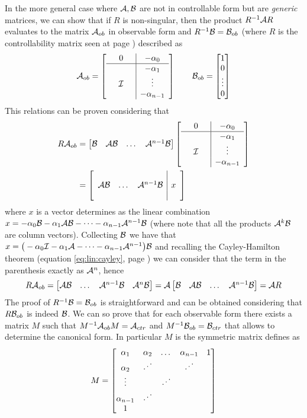 		In the more general case where $\mathcal{A},\mathcal{B}$ are not in controllable form but are \textit{generic} matrices, we can show that if $R$ is non-singular, then the product $R^{-1}\mathcal{A} R$ evaluates to the matrix $\mathcal{A}_{ob}$ in observable form and $R^{-1} \mathcal{B} = \mathcal{B}_{ob}$ (where $R$ is the controllability matrix seen at page \pageref{eq:lin:controllabilitymatrix}) described as
		\[ \mathcal{A}_{ob} = \begin{bmatrix} \begin{array} {c c c | c} 
			& 0 & & -\alpha_0 \\ \hline
			&&& -\alpha_1 \\ & \mathcal{I} & & \vdots \\ &&& -\alpha_{n-1}				
		\end{array} \end{bmatrix} \qquad \mathcal{B}_{ob} = \begin{bmatrix} 1 \\ 0 \\ \vdots \\ 0 \end{bmatrix} \]
		This relations can be proven considering that
		\begin{align*}
			R \mathcal{A}_{ob} & = \begin{bmatrix}  \mathcal{B} &\mathcal{A}\mathcal{B} &\dots & \mathcal{A}^{n-1}\mathcal{B}  \end{bmatrix} \begin{bmatrix} \begin{array} {c c c | c} 
				& 0 & & -\alpha_0 \\ \hline
				&&& -\alpha_1 \\ & \mathcal{I} & & \vdots \\ &&& -\alpha_{n-1}				
			\end{array} \end{bmatrix} \\
			& = \begin{bmatrix}  \begin{array}{c c c  | c}
				&&& \\
				\mathcal{A} \mathcal{B} & \dots &  \mathcal{A}^{n-1}\mathcal{B} & x \\ &&&
			\end{array}  \end{bmatrix}
		\end{align*}
		where $x$ is a vector determines as the linear combination $x = -\alpha_0 \mathcal{B} - \alpha_1 \mathcal{A} \mathcal{B} - \dots - \alpha_{n-1} \mathcal{A}^{n-1}\mathcal{B}$ (where note that all the products $\mathcal{A}^k\mathcal{B}$ are column vectors). Collecting $\mathcal{B}$ we have that
		$x = \big(-\alpha_0 \mathcal{I} - \alpha_1 \mathcal{A}  - \dots - \alpha_{n-1} \mathcal{A}^{n-1} \big) \mathcal{B}$ and recalling the Cayley-Hamilton theorem (equation \ref{eq:lin:cayley}, page \pageref{eq:lin:cayley}) we can consider that the term in the parenthesis exactly as $\mathcal{A}^n$, hence
		\[ R \mathcal{A}_{ob} = \begin{bmatrix}  \mathcal{A} \mathcal{B} & \dots &  \mathcal{A}^{n-1}\mathcal{B} & \mathcal{A}^n \mathcal{B}  \end{bmatrix} = \mathcal{A} \begin{bmatrix}  \mathcal{B} &\mathcal{A}\mathcal{B} &\dots & \mathcal{A}^{n-1}\mathcal{B}  \end{bmatrix} = \mathcal{A} R \]
		The proof of $R^{-1}\mathcal{B}=\mathcal{B}_{ob}$ is straightforward and can be obtained considering that $R \mathcal{B}_{ob}$ is indeed $\mathcal{B}$. We can so prove that for each observable form there exists a matrix $M$ such that $M^{-1} \mathcal{A}_{ob} M = \mathcal{A}_{ctr}$ and $M^{-1}\mathcal{B}_{ob} = \mathcal{B}_{ctr}$ that allows to determine the canonical form. In particular $M$ is the symmetric matrix defines as
		\[ M = \mat{ \alpha_1 & \alpha_2 & \dots & \alpha_{n-1} & 1 \\
		\alpha_2 & \reflectbox{$\ddots$} & & \reflectbox{$\ddots$} \\
		\vdots & & \reflectbox{$\ddots$} \\
		\alpha_{n-1} & \reflectbox{$\ddots$}\\
		1 } \]
	
